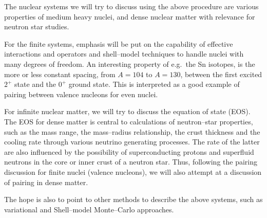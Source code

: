 The nuclear systems we will try to discuss using the
above procedure are various properties of medium heavy nuclei,
and dense nuclear matter with relevance
for neutron star studies.

For the finite systems, emphasis will be put on the
capability of effective interactions
and operators and shell--model techniques to handle nuclei
with many degrees of freedom. An interesting property of e.g.\ the
Sn isotopes, is the more or less constant spacing, from $A=104$ to
$A=130$,
between the first
excited $2^+$ state and the $0^+$ ground state. This is interpreted
as a good example of pairing between valence nucleons
for even nuclei.

For infinite nuclear matter, we will try to discuss
the equation of state (EOS). The EOS
for dense matter is central to calculations of
neutron--star properties, such as the mass range, the mass--radius
relationship, the crust thickness
and the cooling rate through various neutrino generating processes.
The rate of the latter are  also influenced by the possibility of
superconducting protons and superfluid neutrons in the core or
inner crust of a neutron star. Thus, following the pairing discussion
for finite nuclei (valence nucleons),
we will also attempt at a discussion of pairing
in dense matter.

The hope is also to point to other methods to describe the above systems,
such as
variational and
Shell--model Monte--Carlo approaches.








































